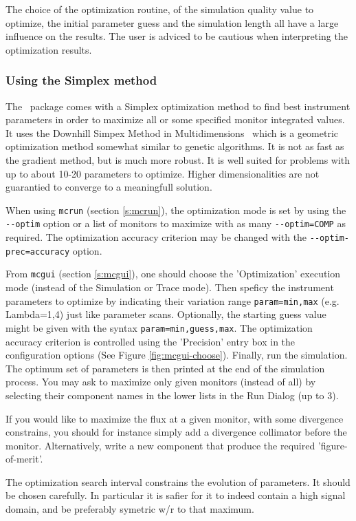 The choice of the optimization routine, of the simulation quality
value to optimize, the initial parameter guess and the simulation
length all have a large influence on the results.
The user is adviced to be cautious when interpreting the optimization results.

\subsubsection{Using the Simplex method}

The \MCS\ package comes with a Simplex optimization method to find best instrument parameters in order to maximize all or some specified monitor integrated values. It uses the Downhill Simpex Method in Multidimensions~\cite{neldermead,NumRecip} which is a geometric optimization method somewhat similar to genetic algorithms. It is not as fast as the gradient method, but is much more robust. It is well suited for problems with up to about 10-20 parameters to optimize. Higher dimensionalities are not guarantied to converge to a meaningfull solution.

When using \verb+mcrun+ (section \ref{s:mcrun}), the optimization mode is set by using the
\verb+--optim+ option or a list of monitors to maximize with as many
\verb+--optim=COMP+ as required. The optimization accuracy criterion
may be changed with the \verb+--optim-prec=accuracy+ option.

From \verb+mcgui+ (section \ref{s:mcgui}), one should choose the
'Optimization' execution mode (instead of the Simulation or Trace
mode). Then speficy the instrument parameters to optimize by
indicating their variation range \verb+param=min,max+ (e.g. Lambda=1,4) just like
parameter scans. Optionally, the starting guess value might be given with the syntax \verb+param=min,guess,max+. The optimization accuracy criterion is controlled
using the 'Precision' entry box in the configuration options (See
Figure \ref{fig:mcgui-choose}). Finally, run the simulation. The optimum
set of parameters is then printed at the end of the simulation
process. You may ask to maximize only given monitors (instead of all)
by selecting their component names in the lower lists in the Run Dialog (up to 3).

If you would like to maximize the flux at a given monitor, with some
divergence constrains, you should for instance simply add a divergence
collimator before the monitor. Alternatively, write a new component
that produce the required 'figure-of-merit'.

The optimization search interval constrains the evolution of parameters. It should be chosen carefully. In particular it is safier for it to indeed contain a high signal domain, and be preferably symetric w/r to that maximum.

